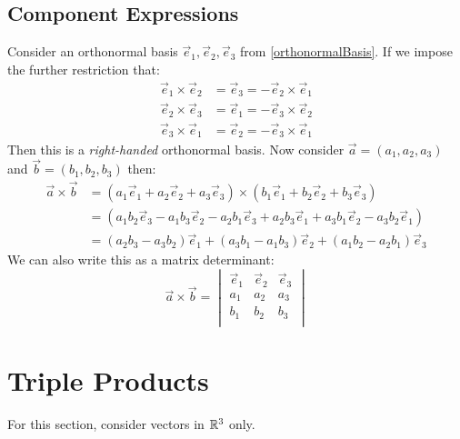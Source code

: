 \documentclass[../main.tex]{subfiles}
\begin{document}
\subsection{Component Expressions}
Consider an orthonormal basis $\vec{e}_1, \vec{e}_2, \vec{e}_3$ from \cref{orthonormalBasis}.
If we impose the further restriction that:
\begin{align*}
  \vec{e}_1 \times \vec{e}_2 &= \vec{e}_3 = -\vec{e}_2 \times \vec{e}_1 \\
  \vec{e}_2 \times \vec{e}_3 &= \vec{e}_1 = -\vec{e}_3 \times \vec{e}_2 \\
  \vec{e}_3 \times \vec{e}_1 &= \vec{e}_2 = -\vec{e}_3 \times \vec{e}_1
\end{align*}
Then this is a \textit{right-handed} orthonormal basis.
Now consider $\vec{a} = (a_1, a_2, a_3)$ and $\vec{b} = (b_1, b_2, b_3)$ then:
\begin{align*}
  \vec{a} \times \vec{b} &= (a_1 \vec{e}_1 + a_2 \vec{e}_2 + a_3 \vec{e}_3) \times (b_1 \vec{e}_1 + b_2 \vec{e}_2 + b_3 \vec{e}_3) \\
                         &= (a_1 b_2 \vec{e}_3 - a_1 b_3 \vec{e}_2 - a_2 b_1 \vec{e}_3 + a_2 b_3 \vec{e}_1 + a_3 b_1 \vec{e}_2 - a_3 b_2 \vec{e}_1) \\
                         &= (a_2 b_3 - a_3 b_2) \vec{e}_1 + (a_3 b_1 - a_1 b_3) \vec{e}_2 + (a_1 b_2 - a_2 b_1) \vec{e}_3
\end{align*}
We can also write this as a matrix determinant:
\[
  \vec{a} \times \vec{b} =\begin{vmatrix}
  \vec{e}_1 & \vec{e}_2 & \vec{e}_3 \\
  a_1 & a_2 & a_3 \\
  b_1 & b_2 & b_3 \\
  \end{vmatrix}
\]
\section{Triple Products}
\begin{remark}[Note]
For this section, consider vectors in $\mathbb{R}^{3}$ only.
\end{remark}
\end{document}
